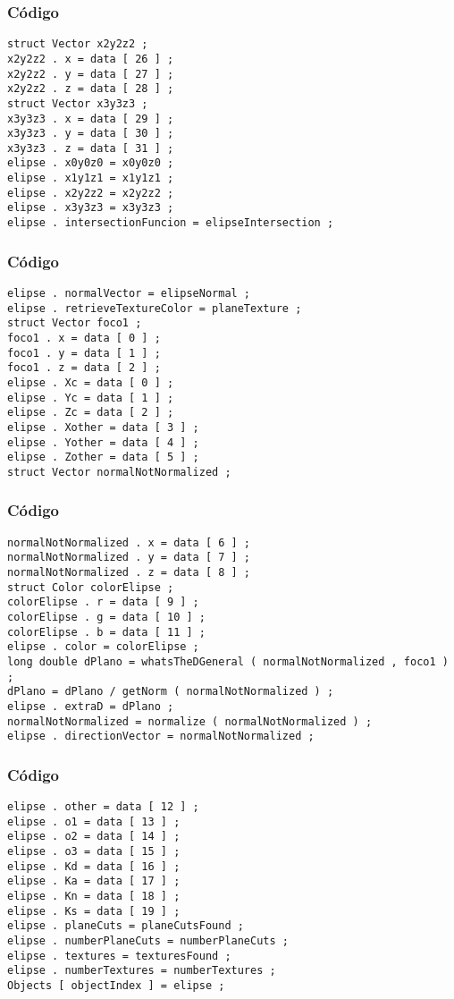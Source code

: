 \documentclass{beamer}
\begin{document}
\begin{frame}[fragile]
\frametitle{C\'odigo}
\begin{verbatim}
struct Vector x2y2z2 ; 
x2y2z2 . x = data [ 26 ] ; 
x2y2z2 . y = data [ 27 ] ; 
x2y2z2 . z = data [ 28 ] ; 
struct Vector x3y3z3 ; 
x3y3z3 . x = data [ 29 ] ; 
x3y3z3 . y = data [ 30 ] ; 
x3y3z3 . z = data [ 31 ] ; 
elipse . x0y0z0 = x0y0z0 ; 
elipse . x1y1z1 = x1y1z1 ; 
elipse . x2y2z2 = x2y2z2 ; 
elipse . x3y3z3 = x3y3z3 ; 
elipse . intersectionFuncion = elipseIntersection ; 
\end{verbatim}
\end{frame}
\begin{frame}[fragile]
\frametitle{C\'odigo}
\begin{verbatim}
elipse . normalVector = elipseNormal ; 
elipse . retrieveTextureColor = planeTexture ; 
struct Vector foco1 ; 
foco1 . x = data [ 0 ] ; 
foco1 . y = data [ 1 ] ; 
foco1 . z = data [ 2 ] ; 
elipse . Xc = data [ 0 ] ; 
elipse . Yc = data [ 1 ] ; 
elipse . Zc = data [ 2 ] ; 
elipse . Xother = data [ 3 ] ; 
elipse . Yother = data [ 4 ] ; 
elipse . Zother = data [ 5 ] ; 
struct Vector normalNotNormalized ; 
\end{verbatim}
\end{frame}
\begin{frame}[fragile]
\frametitle{C\'odigo}
\begin{verbatim}
normalNotNormalized . x = data [ 6 ] ; 
normalNotNormalized . y = data [ 7 ] ; 
normalNotNormalized . z = data [ 8 ] ; 
struct Color colorElipse ; 
colorElipse . r = data [ 9 ] ; 
colorElipse . g = data [ 10 ] ; 
colorElipse . b = data [ 11 ] ; 
elipse . color = colorElipse ; 
long double dPlano = whatsTheDGeneral ( normalNotNormalized , foco1 ) ; 
dPlano = dPlano / getNorm ( normalNotNormalized ) ; 
elipse . extraD = dPlano ; 
normalNotNormalized = normalize ( normalNotNormalized ) ; 
elipse . directionVector = normalNotNormalized ; 
\end{verbatim}
\end{frame}
\begin{frame}[fragile]
\frametitle{C\'odigo}
\begin{verbatim}
elipse . other = data [ 12 ] ; 
elipse . o1 = data [ 13 ] ; 
elipse . o2 = data [ 14 ] ; 
elipse . o3 = data [ 15 ] ; 
elipse . Kd = data [ 16 ] ; 
elipse . Ka = data [ 17 ] ; 
elipse . Kn = data [ 18 ] ; 
elipse . Ks = data [ 19 ] ; 
elipse . planeCuts = planeCutsFound ; 
elipse . numberPlaneCuts = numberPlaneCuts ; 
elipse . textures = texturesFound ; 
elipse . numberTextures = numberTextures ; 
Objects [ objectIndex ] = elipse ; 
\end{verbatim}
\end{frame}
\end{document}
